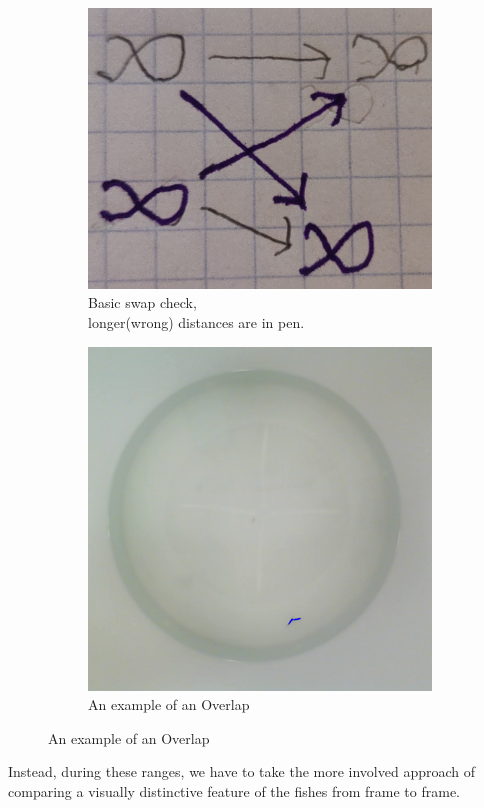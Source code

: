 \documentclass{article}
\begin{document}
\begin{figure}[H]
	\centering
	\begin{subfigure}{.5\textwidth}
		\includegraphics[width=.75\linewidth]{img1}
		\caption{Basic swap check, \\ longer(wrong) distances are in pen.}
		\label{fig:matrix}
	\end{subfigure}%
	\begin{subfigure}{.5\textwidth}
		\includegraphics[width=.75\linewidth]{overlap}
		\caption{An example of an Overlap}
		\label{fig:overlap}
	\end{subfigure}
\end{figure}

Instead, during these ranges, we have to take the more involved approach of comparing a visually distinctive feature of the fishes from frame to frame.
\end{document}

